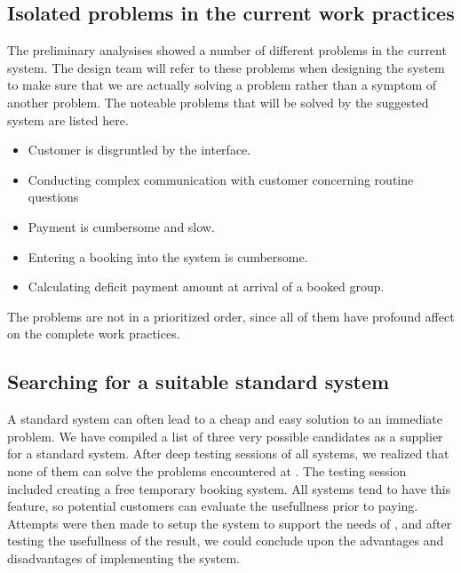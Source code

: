 \subsection{Isolated problems in the current work practices}
The preliminary analysises showed a number of different problems in the current system. 
The design team will refer to these problems when designing the system
to make sure that we are actually solving a problem rather than a symptom
of another problem. The noteable problems that will be solved by the suggested system are listed here.

\begin{itemize}
	\item Customer is disgruntled by the interface.
	\item Conducting complex communication with customer concerning routine questions
	\item Payment is cumbersome and slow.
	\item Entering a booking into the system is cumbersome.
	\item Calculating deficit payment amount at arrival of a booked group.
\end{itemize}

The problems are not in a prioritized order, since all of them have profound
affect on the complete work practices.


\subsection{Searching for a suitable standard system}
A standard system can often lead to a cheap and easy solution to an immediate problem.
We have compiled a list of three very possible
candidates as a supplier for a standard system. 
After deep testing sessions of all systems, we realized that none
of them can solve the problems encountered at \gomonkey{}. The testing
session included creating a free temporary booking system. All systems tend to 
have this feature, so potential customers can evaluate the usefullness prior to 
paying. Attempts were then made to setup the system to support the needs of
\gomonkey{}, and after testing the usefullness of the result, we could conclude
upon the advantages and disadvantages of implementing the system.


